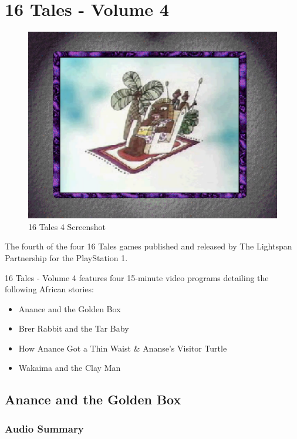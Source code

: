 \chapter{16 Tales - Volume 4}

\begin{figure}[H]
    \centering
    \includegraphics[width=\textwidth/2]{"./Games/16Tales/Images/16Tales4Screenshot.png"}
    \caption{16 Tales 4 Screenshot}
\end{figure}

The fourth of the four 16 Tales games published and released by The Lightspan Partnership for the PlayStation 1.

16 Tales - Volume 4 features four 15-minute video programs detailing the following African stories:

\begin{itemize}
    \item Anance and the Golden Box
    \item Brer Rabbit and the Tar Baby
    \item How Anance Got a Thin Waist \& Ananse's Visitor Turtle
    \item Wakaima and the Clay Man
\end{itemize}

\clearpage
\newpage

\section{Anance and the Golden Box}

\subsection{Audio Summary}

